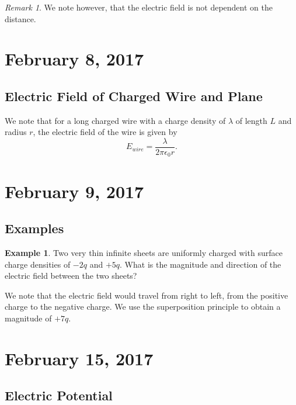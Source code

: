 \documentclass[11pt]{article}
\theoremstyle{plain} %
\theoremstyle{definition}
\theoremstyle{example}
\newtheorem*{example}{Example}
\theoremstyle{remark}
\newtheorem*{remark}{Remark}
\begin{document}
\begin{remark}
We note however, that the electric field is not dependent on the distance.
\end{remark}

\section{February 8, 2017}
\subsection{Electric Field of Charged Wire and Plane}

We note that for a long charged wire with a charge density of $\lambda$ of length $L$ and radius $r$, the electric field of the wire is given by 
$$E_{wire} = \frac{\lambda}{2\pi\epsilon_0r}.$$



\section{February 9, 2017}
\subsection{Examples}

\begin{example}
Two very thin infinite sheets are uniformly charged with surface charge densities of $-2q$ and $+5q$. What is the magnitude and direction of the electric field between the two sheets?
\end{example}

We note that the electric field would travel from right to left, from the positive charge to the negative charge. We use the superposition principle to obtain a magnitude of $+7q$. 


\section{February 15, 2017}
\subsection{Electric Potential}
\end{document}
